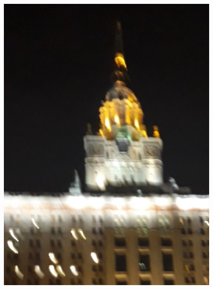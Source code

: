 \begin{figure} [H]
\begin{minipage}[h]{0.28\linewidth}
\includegraphics[width=1\linewidth, right]{pics/fields/orig.jpg} \\ 
\end{minipage}
\hfill
\begin{minipage}[h]{0.28\linewidth}

\end{minipage}
\end{figure}
